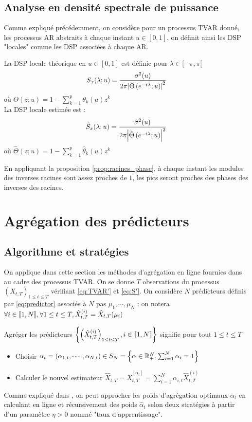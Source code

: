 \documentclass{report}
\begin{document}
\subsection{Analyse en densité spectrale de puissance}
Comme expliqué précédemment, on considère pour un processus TVAR donné, les processus AR abstraits à chaque instant $u\in [0,1]$, on définit ainsi les DSP "locales" comme les DSP associées à chaque AR.
\begin{Def}[DSP]
La DSP locale théorique en $u\in [0,1]$ est définie pour $\lambda \in [-\pi, \pi[$ 
$$
S_x(\lambda ; u) = \frac{\sigma^2(u)}{2\pi{ \left| \Theta\left( e^{-i\lambda} ; u \right) \right|}^2}
$$
où $\Theta(z;u) = 1 - \sum_{k=1}^p \theta_k(u) z^k$ \\
La DSP locale estimée est : 
$$
\hat{S}_x(\lambda ; u) = \frac{\hat{\sigma}^2(u)}{2\pi{ \left| \hat{\Theta}\left( e^{-i\lambda} ; u \right) \right|}^2}
$$
où $\hat{\Theta}(z;u) = 1 - \sum_{k=1}^p \hat{\theta}_k(u) z^k$
\end{Def}

En appliquant la proposition \ref{prop:racines_phase}, à chaque instant les modules des inverses racines sont assez proches de $1$, les pics seront proches des phases des inverses des racines.
\section{Agrégation des prédicteurs}
\subsection{Algorithme et stratégies}
On applique dans cette section les méthodes d'agrégation en ligne fournies dans \citep{giraud-roueff-sanchez-aos2015} au cadre des processus TVAR. On se donne $T$ observations du processus $(X_{t,T})_{1 \leq t \leq T}$ vérifiant \eqref{eq:TVAR'} et \eqref{eq:S'}. On considère $N$ prédicteurs définis par \eqref{eq:predictor} associés à $N$ pas $\mu_1, \cdots, \mu_N$ : on notera $\forall i \in {\left\llbracket 1,N \right\rrbracket}, \forall 1\leq t \leq T, \hat{X}_{t,T}^{(i)} = \hat{X}_{t,T}(\mu_i)$
\begin{Def}[Agrégation]
Agréger les prédicteurs ${ \left\lbrace \left(\hat{X}_{t,T}^{(i)}\right)_{1\leq t\leq T}, i\in {\left\llbracket 1,N \right\rrbracket} \right\rbrace }$ signifie pour tout $1\leq t \leq T$
\begin{itemize}
\item Choisir $\alpha_t=(\alpha_{1,t},\cdots,\alpha_{N,t})\in S_N = { \left\lbrace \alpha \in \mathbb{R}_+^N, \sum_{i=1}^N \alpha_{i} = 1 \right\rbrace }$ 
\item Calculer le nouvel estimateur $\hat{X}_{t,T} = \hat{X}_{t,T}^{[\alpha_t]} = \sum_{i=1}^N \alpha_{i,t} \hat{X}_{t,T}^{(i)}$
\end{itemize}
\end{Def}
Comme expliqué dans \citep{giraud-roueff-sanchez-aos2015}, on peut approcher les poids d'agrégation optimaux $\alpha_t$ en calculant en ligne et récursivement des poids $\hat{\alpha}_t$ selon deux stratégies à partir d'un paramètre $\eta >0$ nommé "taux d'apprentissage". \\
\end{document}
